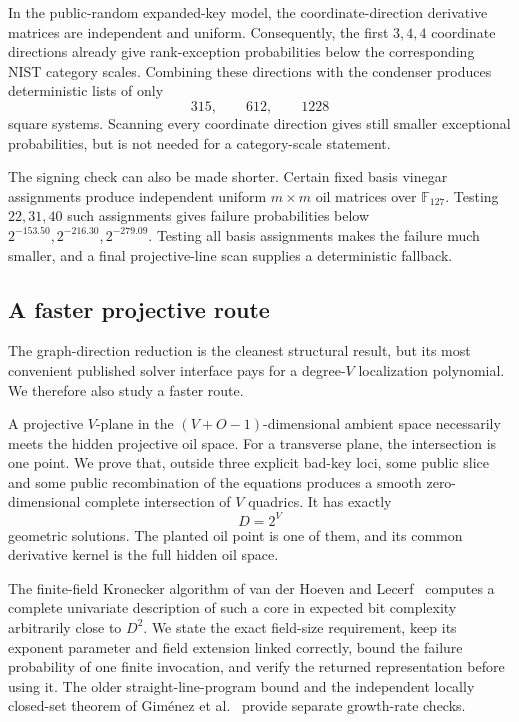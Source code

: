\documentclass[11pt,a4paper]{article}
\theoremstyle{definition}
\theoremstyle{remark}
\newcommand{\F}{\mathbb F}
\begin{document}
In the public-random expanded-key model, the coordinate-direction derivative matrices are independent and uniform.  Consequently, the first $3,4,4$ coordinate directions already give rank-exception probabilities below the corresponding NIST category scales.  Combining these directions with the condenser produces deterministic lists of only
\[
315,
\qquad612,
\qquad1228
\]
square systems.  Scanning every coordinate direction gives still smaller exceptional probabilities, but is not needed for a category-scale statement.

The signing check can also be made shorter.  Certain fixed basis vinegar assignments produce independent uniform $m\times m$ oil matrices over $\F_{127}$.  Testing $22,31,40$ such assignments gives failure probabilities below $2^{-153.50},2^{-216.30},2^{-279.09}$.  Testing all basis assignments makes the failure much smaller, and a final projective-line scan supplies a deterministic fallback.

\subsection*{A faster projective route}
The graph-direction reduction is the cleanest structural result, but its most convenient published solver interface pays for a degree-$V$ localization polynomial.  We therefore also study a faster route.

A projective $V$-plane in the $(V+O-1)$-dimensional ambient space necessarily meets the hidden projective oil space.  For a transverse plane, the intersection is one point.  We prove that, outside three explicit bad-key loci, some public slice and some public recombination of the equations produces a smooth zero-dimensional complete intersection of $V$ quadrics.  It has exactly
\[
D=2^V
\]
geometric solutions.  The planted oil point is one of them, and its common derivative kernel is the full hidden oil space.

The finite-field Kronecker algorithm of van der Hoeven and Lecerf~\cite{vdHL} computes a complete univariate description of such a core in expected bit complexity arbitrarily close to $D^2$.  We state the exact field-size requirement, keep its exponent parameter and field extension linked correctly, bound the failure probability of one finite invocation, and verify the returned representation before using it.  The older straight-line-program bound and the independent locally closed-set theorem of Gim\'enez et al.~\cite{GiustiLecerfSalvy2001,Gimenez2026} provide separate growth-rate checks.
\end{document}
